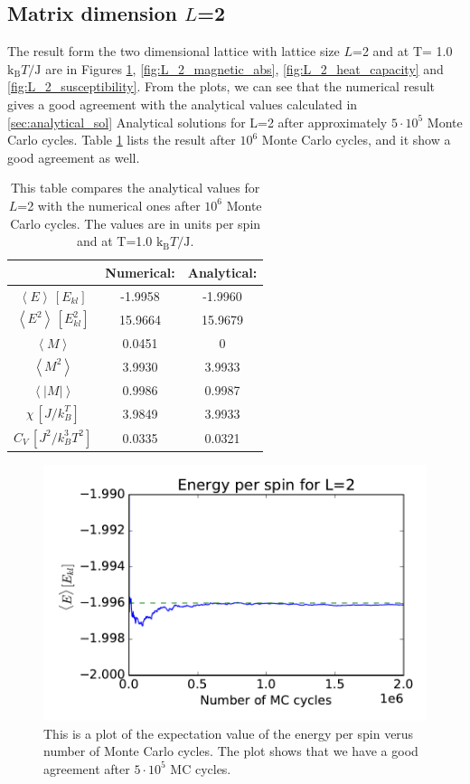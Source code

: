 \subsection{Matrix dimension $L$=2}

The result form the two dimensional lattice with lattice size $L$=2 and at T= 1.0 $\text{k}_\text{B}T/\text{J}$ are in Figures \ref{fig:L_2_energy}, \ref{fig:L_2_magnetic_abs}, \ref{fig:L_2_heat_capacity} and \ref{fig:L_2_susceptibility}. From the plots, we can see that the numerical result gives a good agreement with the analytical values calculated in \ref{sec:analytical_sol} Analytical solutions for L=2 after approximately $5\cdot 10^5$ Monte Carlo cycles. Table \ref{tab:compare_values} lists the result after $10^6$ Monte Carlo cycles, and it show a good agreement as well. 

\begin{table}\caption{This table compares the analytical values for $L$=2 with the numerical ones after $10^6$ Monte Carlo cycles. The values are in units per spin and at T=1.0 $\text{k}_\text{B}T/\text{J}$.}\label{tab:compare_values}
\begin{tabular}{ccc}
& Numerical: & Analytical:\\ \hline
$\left<E\right>\, [E_{kl}]$ &   -1.9958 & -1.9960\\
$\left<E^2\right>\, [E_{kl}^2]$ &   15.9664 & 15.9679\\
$\left<M\right>$ &    0.0451 & 0\\
$\left<M^2\right>$ &    3.9930 & 3.9933\\
$\left<|M|\right>$ &    0.9986 & 0.9987\\
$\chi \, [J/k_B^T]$ &   3.9849 & 3.9933\\
$C_V \, [J^2/k_B^3T^2]$& 0.0335 & 0.0321\\
\end{tabular}
\end{table}

\begin{figure}[H]
\includegraphics[width=\linewidth]{../results/4b/L_2_energy}\caption{This is a plot of the expectation value of the energy per spin verus number of Monte Carlo cycles. The plot shows that we have a good agreement after $ 5 \cdot 10^{5} $ MC cycles.}\label{fig:L_2_energy}
\end{figure}

